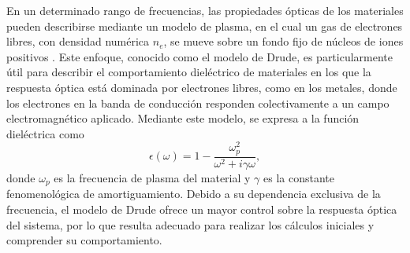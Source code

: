 En un determinado rango de frecuencias, las propiedades ópticas de los materiales pueden describirse mediante un modelo de plasma, en el cual un gas de electrones libres, con densidad numérica $n_e$, se mueve sobre un fondo fijo de núcleos de iones positivos \cite{Plasmonics}. Este enfoque, conocido como el modelo de Drude, es particularmente útil para describir el comportamiento dieléctrico de materiales en los que la respuesta óptica está dominada por electrones libres, como en los metales, donde los electrones en la banda de conducción responden colectivamente a un campo electromagnético aplicado. Mediante este modelo, se expresa a la función dieléctrica como \cite{Plasmonics}
\begin{equation} \epsilon(\omega) = 1 - \frac{\omega_p^2}{\omega^2 + i\gamma\omega}, \end{equation}
donde $\omega_p$ es la frecuencia de plasma del material y $\gamma$ es la constante fenomenológica de amortiguamiento. Debido a su dependencia exclusiva de la frecuencia, el modelo de Drude ofrece un mayor control sobre la respuesta óptica del sistema, por lo que resulta adecuado para realizar los cálculos iniciales y comprender su comportamiento.\\


